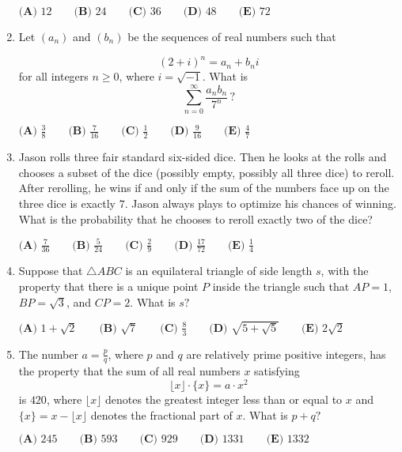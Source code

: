 \documentclass{article}
\begin{document}
\begin{enumerate}[label=\arabic*., itemsep=0.5em]
\(\textbf{(A) } 12 \qquad \textbf{(B) } 24 \qquad \textbf{(C) } 36 \qquad \textbf{(D) } 48 \qquad \textbf{(E) } 72\)\par \vspace{0.5em}\item Let \((a_n)\) and \((b_n)\) be the sequences of real numbers such that

\begin{equation*}
(2 + i)^n = a_n + b_ni
\end{equation*}
for all integers \(n\geq 0\), where \(i = \sqrt{-1}\). What is
\begin{equation*}
\sum_{n=0}^\infty\frac{a_nb_n}{7^n}\,?
\end{equation*}

\(\textbf{(A) }\frac 38\qquad\textbf{(B) }\frac7{16}\qquad\textbf{(C) }\frac12\qquad\textbf{(D) }\frac9{16}\qquad\textbf{(E) }\frac47\)\par \vspace{0.5em}\item Jason rolls three fair standard six-sided dice. Then he looks at the rolls and chooses a subset of the dice (possibly empty, possibly all three dice) to reroll. After rerolling, he wins if and only if the sum of the numbers face up on the three dice is exactly \(7\). Jason always plays to optimize his chances of winning. What is the probability that he chooses to reroll exactly two of the dice?

\(\textbf{(A) } \frac{7}{36} \qquad\textbf{(B) } \frac{5}{24} \qquad\textbf{(C) } \frac{2}{9} \qquad\textbf{(D) } \frac{17}{72} \qquad\textbf{(E) } \frac{1}{4}\)\par \vspace{0.5em}\item Suppose that \(\triangle ABC\) is an equilateral triangle of side length \(s\), with the property that there is a unique point \(P\) inside the triangle such that \(AP = 1\), \(BP = \sqrt{3}\), and \(CP = 2\). What is \(s?\)

\(\textbf{(A) } 1 + \sqrt{2} \qquad \textbf{(B) } \sqrt{7} \qquad \textbf{(C) } \frac{8}{3} \qquad \textbf{(D) } \sqrt{5 + \sqrt{5}} \qquad \textbf{(E) } 2\sqrt{2}\)\par \vspace{0.5em}\item The number \(a = \tfrac{p}{q}\), where \(p\) and \(q\) are relatively prime positive integers, has the property that the sum of all real numbers \(x\) satisfying
\begin{equation*}
\lfloor x \rfloor \cdot \{x\} = a \cdot x^2
\end{equation*}
is \(420\), where \(\lfloor x \rfloor\) denotes the greatest integer less than or equal to \(x\) and \(\{x\} = x - \lfloor x \rfloor\) denotes the fractional part of \(x\). What is \(p + q?\)

\(\textbf{(A) } 245 \qquad \textbf{(B) } 593 \qquad \textbf{(C) } 929 \qquad \textbf{(D) } 1331 \qquad \textbf{(E) } 1332\)\par \vspace{0.5em}\end{enumerate}
\end{document}
